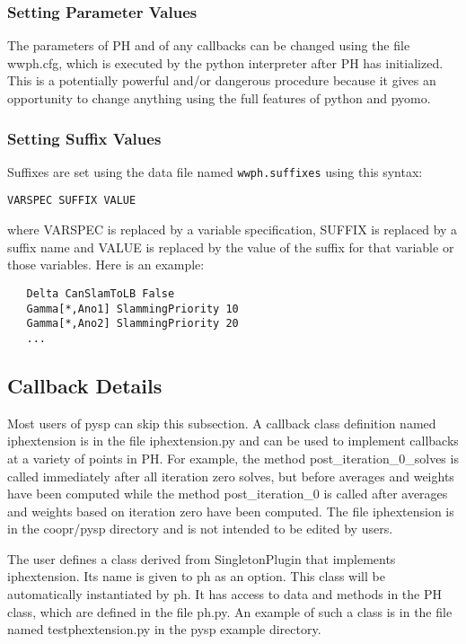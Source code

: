 \subsubsection{Setting Parameter Values \label{ParmSec}}

The parameters of PH and of any callbacks can be changed using the file
wwph.cfg, which is executed by the python interpreter after PH has initialized.
This is a potentially powerful and/or dangerous procedure because it gives an
opportunity to change anything using the full features of python and pyomo.

\subsubsection{Setting Suffix Values \label{SuffixSec}}

Suffixes are set using the data file named \verb|wwph.suffixes| using this
syntax:

\begin{verbatim}
VARSPEC SUFFIX VALUE
\end{verbatim}

where VARSPEC is replaced by a variable specification, SUFFIX is replaced by a
suffix name and VALUE is replaced by the value of the suffix for that variable
or those variables. Here is an example:

\begin{verbatim}
   Delta CanSlamToLB False
   Gamma[*,Ano1] SlammingPriority 10
   Gamma[*,Ano2] SlammingPriority 20
   ...
\end{verbatim}


\subsection{Callback Details \label{ExtensionDetailsSec}}

Most users of pysp can skip this subsection. A callback class definition named
iphextension is in the file iphextension.py and can be used to implement
callbacks at a variety of points in PH. For example, the method
post\_iteration\_0\_solves is called immediately after all iteration zero
solves, but before averages and weights have been computed while the method
post\_iteration\_0 is called after averages and weights based on iteration zero
have been computed. The file iphextension is in the coopr/pysp directory and is
not intended to be edited by users.

The user defines a class derived from SingletonPlugin that implements
iphextension. Its name is given to ph as an option. This class will be
automatically instantiated by ph. It has access to data and methods in the PH
class, which are defined in the file ph.py. An example of such a class is in the
file named testphextension.py in the pysp example directory.

